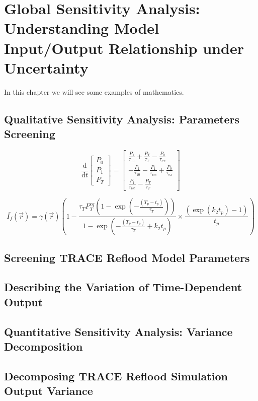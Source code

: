\chapter{Global Sensitivity Analysis: \\ Understanding Model Input/Output Relationship under Uncertainty}

In this chapter we will see some examples of mathematics.

\lipsum[1]

\section{Qualitative Sensitivity Analysis: Parameters Screening}
\lipsum[2]

\begin{equation}\label{eqn:rate_eqns}
\frac{\textrm{d}}{\textrm{d}t}\left[
\begin{array}{l}
P_{\textit{0}} \\
P_{\textit{1}} \\
P_{\textit{T}}
\end{array}
\right] =
\left[
\begin{array}{l}
\frac{P_{\textit{1}}}{\tau_{\textit{10}}} + \frac{P_{\textit{T}}}{\tau_{\textit{T}}} - \frac{P_{\textit{0}}}{\tau_{\textit{ex}}} \\
- \frac{P_{\textit{1}}}{\tau_{\textit{10}}} - \frac{P_{\textit{1}}}{\tau_{isc}} + \frac{P_{\textit{0}}}{\tau_{\textit{ex}}} \\
\frac{P_{\textit{1}}}{\tau_{isc}} -  \frac{P_{\textit{T}}}{\tau_{\textit{T}}}
\end{array}
\right]
\end{equation}

\lipsum[3]


\begin{equation}\label{eqn:avgfluorescence}
\bar{I_{f}}(\vec{r})	 
	= \gamma(\vec{r}) \left(1 - \frac{\tau_{\textit{T}} P_{\textit{T}}^{{eq}}\left(1-\exp \left(-\frac{(T_p - t_p)}{\tau_{\textit{T}}}\right)\right)}{1-\exp\left(-\frac{(T_p - t_p)}{\tau_{\textit{T}}} + k_{\textit{2}} t_p\right)} \times \frac{\left(\exp\left(k_{\textit{2}} t_p\right)-1\right)}{t_p} \right) 
\end{equation}

\lipsum[3]

\section{Screening TRACE Reflood Model Parameters}

\section{Describing the Variation of Time-Dependent Output}

\section{Quantitative Sensitivity Analysis: Variance Decomposition}

\section{Decomposing TRACE Reflood Simulation Output Variance}